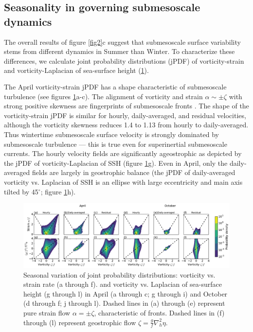 \documentclass[grl]{agutex2015}
\begin{document}
\begin{article}
\section{Seasonality in governing submesoscale dynamics}
The overall results of figure \ref{fig2}c suggest that submesoscale surface
 variability stems from different dynamics in Summer than Winter.
 To characterize these differences, we calculate
joint probability distributions (jPDF) of
vorticity-strain and vorticity-Laplacian of sea-surface height (\ref{fig3}).

The April vorticity-strain jPDF has a shape characteristic of submesoscale turbulence
 (see figures \ref{fig3}a-c). The alignment of vorticity and strain $\alpha \sim \pm\zeta$
 with strong positive skewness are fingerprints of submesoscale fronts
 \citep{shcherbina_etal2013,mcwilliams2016}. The shape of the vorticity-strain
 jPDF is similar for hourly, daily-averaged, and residual velocities, although
 the vorticity skewness reduces 1.4 to 1.13 from hourly to daily-averaged.
 Thus wintertime submesoscale surface velocity is strongly dominated by submesoscale turbulence --- this is true even for
 superinertial submesoscale currents. The hourly velocity fields are significantly
ageostrophic as depicted by the jPDF of vorticity-Laplacian of SSH
(figure \ref{fig3}g). Even in April, only the daily-averaged fields
are largely
in  geostrophic balance (the jPDF of daily-averaged vorticity vs. Laplacian of SSH
is an ellipse with large eccentricity and main axis tilted by 45$^\circ$; figure \ref{fig3}h).


\begin{figure}[ht]
  \begin{center}
    \includegraphics[width=1.\textwidth]{figs/fig3.pdf}
 \caption{Seasonal variation of joint probability distributions:  vorticity vs. strain rate (a through f).
          and vorticity vs. Laplacian of sea-surface height (g through l) in April (a through c;
          g  through i) and October (d through f;
          j  through l).
          Dashed lines in (a) through (e) represent pure strain flow $\alpha = \pm\zeta$,
          characteristic of fronts. Dashed lines in (f) through
          (l) represent geostrophic flow $\zeta = \frac{g}{f}\nabla_h^2 \eta$.}
 \label{fig3}
 \end{center}
\end{figure}


\end{article}
\end{document}
